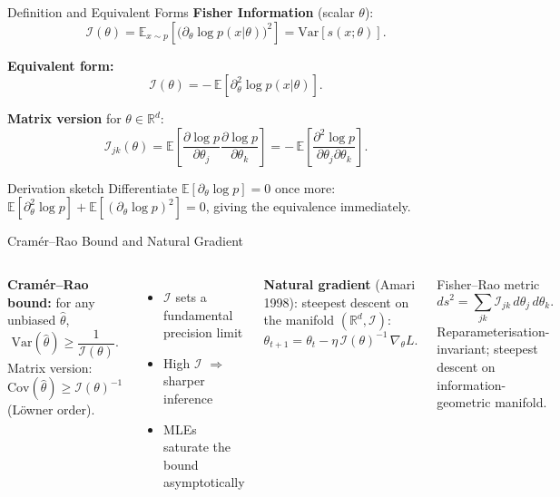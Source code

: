 \documentclass[aspectratio=169,10pt]{beamer}
\newcommand{\E}{\mathbb{E}}
\newcommand{\Variance}{\mathrm{Var}}
\newcommand{\R}{\mathbb{R}}
\newcommand{\FI}{\mathcal{I}}    %
\begin{document}
\begin{frame}{Definition and Equivalent Forms}
  \textbf{Fisher Information} (scalar $\theta$):
  \[
    \FI(\theta)
    = \E_{x\sim p}\!\left[
        \bigl(\partial_\theta \log p(x|\theta)\bigr)^2
      \right]
    = \Variance[s(x;\theta)].
  \]

  \textbf{Equivalent form:}
  \[
    \FI(\theta) = -\,\E\!\left[\partial_\theta^2 \log p(x|\theta)\right].
  \]

  \textbf{Matrix version} for $\theta\in\R^d$:
  \[
    \FI_{jk}(\theta)
    = \E\!\left[
        \frac{\partial\log p}{\partial\theta_j}
        \frac{\partial\log p}{\partial\theta_k}
      \right]
    = -\,\E\!\left[
        \frac{\partial^2\log p}{\partial\theta_j\partial\theta_k}
      \right].
  \]

  \begin{block}{Derivation sketch}
    Differentiate $\E[\partial_\theta\log p]=0$ once more:
    $\E[\partial_\theta^2\log p]+\E[(\partial_\theta\log p)^2]=0$,
    giving the equivalence immediately.
  \end{block}
\end{frame}

\begin{frame}{Cramér--Rao Bound and Natural Gradient}
  \begin{columns}[T]
    \textbf{Cramér--Rao bound:}
    for any unbiased $\hat\theta$,
    \[
      \Variance(\hat\theta) \geq \frac{1}{\FI(\theta)}.
    \]
    Matrix version: $\mathrm{Cov}(\hat\theta)\geq\FI(\theta)^{-1}$
    (Löwner order).
    \begin{itemize}\itemsep2pt
      \item $\FI$ sets a fundamental precision limit
      \item High $\FI$ $\Rightarrow$ sharper inference
      \item MLEs saturate the bound asymptotically
    \end{itemize}
    \textbf{Natural gradient} (Amari 1998):
    steepest descent on the manifold $(\R^d,\FI)$:
    \[
      \theta_{t+1}
      = \theta_t - \eta\,\FI(\theta)^{-1}\,\nabla_\theta L.
    \]
    \begin{block}{Fisher--Rao metric}
      \[
        ds^2 = \sum_{jk}\FI_{jk}\,d\theta_j\,d\theta_k.
      \]
      Reparameterisation-invariant;
      steepest descent on information-geometric manifold.
    \end{block}
  \end{columns}
\end{frame}
\end{document}
